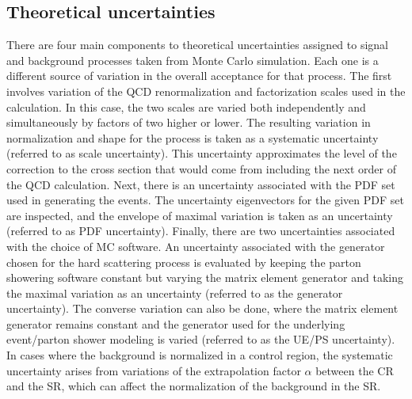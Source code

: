 \subsection{Theoretical uncertainties}
\label{sec:theory_uncert_WW}

There are four main components to theoretical uncertainties assigned to signal and background processes taken from Monte Carlo simulation. Each one is a different source of variation in the overall acceptance for that process. The first involves variation of the QCD renormalization and factorization scales used in the calculation. In this case, the two scales are varied both independently and simultaneously by factors of two higher or lower. The resulting variation in normalization and shape for the process is taken as a systematic uncertainty (referred to as scale uncertainty). This uncertainty approximates the level of the correction to the cross section that would come from including the next order of the QCD calculation. Next, there is an uncertainty associated with the PDF set used in generating the events. The uncertainty eigenvectors for the given PDF set are inspected, and the envelope of maximal variation is taken as an uncertainty  (referred to as PDF uncertainty). Finally, there are two uncertainties associated with the choice of MC software. An uncertainty associated with the generator chosen for the hard scattering process is evaluated by keeping the parton showering software constant but varying the matrix element generator and taking the maximal variation as an uncertainty (referred to as the generator uncertainty). The converse variation can also be done, where the matrix element generator remains constant and the generator used for the underlying event/parton shower modeling is varied (referred to as the UE/PS uncertainty). In cases where the background is normalized in a control region, the systematic uncertainty arises from variations of the extrapolation factor $\alpha$ between the CR and the SR, which can affect the normalization of the background in the SR. 


